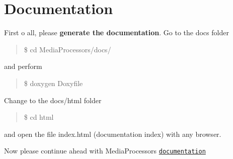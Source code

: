 \section*{Documentation }

First o all, please {\bfseries generate the documentation}. Go to the \textquotesingle{}docs\textquotesingle{} folder

\begin{quote}
\$ cd Media\+Processors/docs/ \end{quote}


and perform

\begin{quote}
\$ doxygen Doxyfile \end{quote}


Change to the \textquotesingle{}docs/html\textquotesingle{} folder

\begin{quote}
\$ cd html \end{quote}


and open the file \textquotesingle{}index.\+html\textquotesingle{} (documentation index) with any browser.

Now please continue ahead with Media\+Processors \href{md_DOCUMENTATION.html}{\tt documentation} 